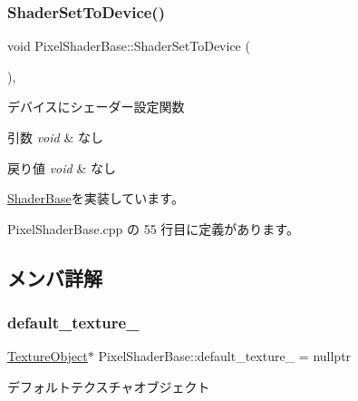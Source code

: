 \subsubsection{\texorpdfstring{Shader\+Set\+To\+Device()}{ShaderSetToDevice()}}
{\footnotesize\ttfamily void Pixel\+Shader\+Base\+::\+Shader\+Set\+To\+Device (\begin{DoxyParamCaption}{ }\end{DoxyParamCaption})\hspace{0.3cm}{\ttfamily [override]}, {\ttfamily [virtual]}}



デバイスにシェーダー設定関数 


\begin{DoxyParams}{引数}
{\em void} & なし \\
\hline
\end{DoxyParams}

\begin{DoxyRetVals}{戻り値}
{\em void} & なし \\
\hline
\end{DoxyRetVals}


\mbox{\hyperlink{class_shader_base_a78e5b6f343821648409d50653e0105e2}{Shader\+Base}}を実装しています。



 Pixel\+Shader\+Base.\+cpp の 55 行目に定義があります。



\subsection{メンバ詳解}
\mbox{\label{class_pixel_shader_base_a9bd118473860effedf5ab1201352540f}} 
\subsubsection{\texorpdfstring{default\+\_\+texture\+\_\+}{default\_texture\_}}
{\footnotesize\ttfamily \mbox{\hyperlink{class_texture_object}{Texture\+Object}}$\ast$ Pixel\+Shader\+Base\+::default\+\_\+texture\+\_\+ = nullptr\hspace{0.3cm}{\ttfamily [private]}}



デフォルトテクスチャオブジェクト 



